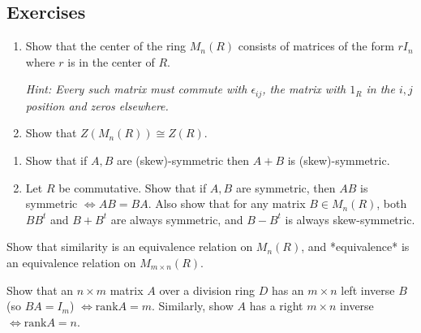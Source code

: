 \subsection{Exercises}

\begin{problem}[Hungerford 7.1.3]
\label{prob:1.1}
\hfill
\begin{enumerate}
    \item Show that the center of the ring $M_n(R)$ consists of matrices of the form $rI_n$ where $r$ is in the center of $R$.
    
    \textit{Hint: Every such matrix must commute with $\epsilon_{ij}$, the matrix with $1_R$ in the $i,j$ position and zeros elsewhere.}
    
    \item Show that $Z(M_n(R)) \cong Z(R)$.
\end{enumerate}
\end{problem}

\begin{problem}[Hungerford 7.1.5]
\label{prob:1.1}
\hfill
\begin{enumerate}
    \item Show that if $A, B$ are (skew)-symmetric then $A+B$ is (skew)-symmetric.
    \item Let $R$ be commutative. 
    Show that if $A,B$ are symmetric, then $AB$ is symmetric $\iff AB=BA$.
    Also show that for any matrix $B \in M_n(R)$, both $BB^t$ and $B+B^t$ are always symmetric, and $B-B^t$ is always skew-symmetric.
\end{enumerate}
\end{problem}

\begin{problem}[Hungerford 7.1.7]
\label{prob:1.1}
Show that similarity is an equivalence relation on $M_n(R)$, and *equivalence* is an equivalence relation on $M_{m\times n}(R)$.
\end{problem}

\begin{problem}[Hungerford 7.2.2]
\label{prob:1.1}
Show that an $n\times m$ matrix $A$ over a division ring $D$ has an $m\times n$ left inverse $B$ (so $BA = I_m$) $\iff \mathrm{rank} A = m$. Similarly, show $A$ has a right $m\times n$ inverse $\iff \mathrm{rank} A = n$.
\end{problem}

